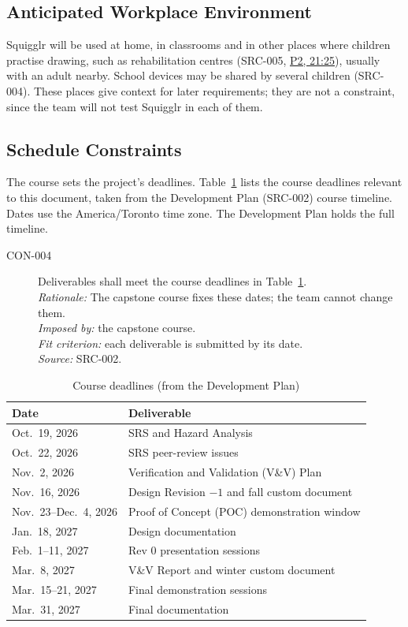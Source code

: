 \documentclass[12pt]{article}
\renewcommand{\_}{\textunderscore\allowbreak}%
\newcommand{\intlink}[3]{\hyperref[int:#1-#2]{#3}}
\newcommand{\intref}[2]{\intlink{#1}{#2}{#1, #2}}
\begin{document}
\subsection{Anticipated Workplace Environment}
Squigglr will be used at home, in classrooms and in other places where children
practise drawing, such as rehabilitation centres (SRC-005, \intref{P2}{21:25}),
usually with an adult nearby. School devices may be shared by several children
(SRC-004). These places give context for later requirements; they are not a
constraint, since the team will not test Squigglr in each of them.


\subsection{Schedule Constraints}
The course sets the project's deadlines. Table~\ref{tab:con-schedule} lists the
course deadlines relevant to this document, taken from the Development Plan
(SRC-002) course timeline. Dates use the America/Toronto time zone. The
Development Plan holds the full timeline.

\begin{description}
\item[CON-004] Deliverables shall meet the course deadlines in
Table~\ref{tab:con-schedule}.\\
\emph{Rationale:} The capstone course fixes these dates; the team cannot change
them.\\
\emph{Imposed by:} the capstone course.\\
\emph{Fit criterion:} each deliverable is submitted by its date.\\
\emph{Source:} SRC-002.
\end{description}

\begin{table}[H]
\centering
\small
\caption{Course deadlines (from the Development Plan)}
\label{tab:con-schedule}
\begin{tabular}{@{}ll@{}}
\toprule
\textbf{Date} & \textbf{Deliverable}\\
\midrule
Oct.\ 19, 2026 & SRS and Hazard Analysis\\
Oct.\ 22, 2026 & SRS peer-review issues\\
Nov.\ 2, 2026 & Verification and Validation (V\&V) Plan\\
Nov.\ 16, 2026 & Design Revision $-1$ and fall custom document\\
Nov.\ 23--Dec.\ 4, 2026 & Proof of Concept (POC) demonstration window\\
Jan.\ 18, 2027 & Design documentation\\
Feb.\ 1--11, 2027 & Rev 0 presentation sessions\\
Mar.\ 8, 2027 & V\&V Report and winter custom document\\
Mar.\ 15--21, 2027 & Final demonstration sessions\\
Mar.\ 31, 2027 & Final documentation\\
\bottomrule
\end{tabular}
\end{table}
\end{document}
